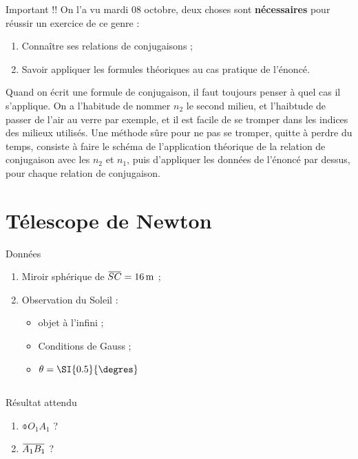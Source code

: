 \documentclass[10pt,a5paper,notitlepage]{book}
\begin{document}
\begin{NCimpo}{Important !!}
    On l'a vu mardi 08 octobre, deux choses sont \textbf{nécessaires} pour
    réussir un exercice de ce genre :
    \begin{enumerate}
        \item {\huge Connaître ses relations de conjugaisons} ;
        \item {\Huge Savoir appliquer les formules théoriques au cas pratique de
            l'énoncé}.
    \end{enumerate}
    Quand on écrit une formule de conjugaison, il faut toujours penser à quel
    cas il s'applique. On a l'habitude de nommer $n_2$ le second milieu, et
    l'haibtude de passer de l'air au verre par exemple, et il est facile de se
    tromper dans les indices des milieux utilisés. Une méthode sûre pour ne pas
    se tromper, quitte à perdre du temps, consiste à faire le schéma de
    l'application théorique de la relation de conjugaison avec les $n_2$ et
    $n_1$, puis d'appliquer les données de l'énoncé par dessus, pour chaque
    relation de conjugaison.
\end{NCimpo}

\section{Télescope de Newton}
\begin{NCdefi}{Données}
    \begin{enumerate}
        \item Miroir sphérique de $\SC = \SI{16}{m}$ ;
        \item Observation du Soleil :
            \begin{itemize}
                \item objet à l'infini ;
                \item Conditions de Gauss ;
                \item $\t = \SI{0.5}{\degres}$
            \end{itemize}
    \end{enumerate}
\end{NCdefi}

\subsection{}

\begin{NCprop}{Résultat attendu}
    \begin{enumerate}
        \item $\obar{O_1A_1}$ ?
        \item $\ABa$ ?
    \end{enumerate}
\end{NCprop}
\end{document}
